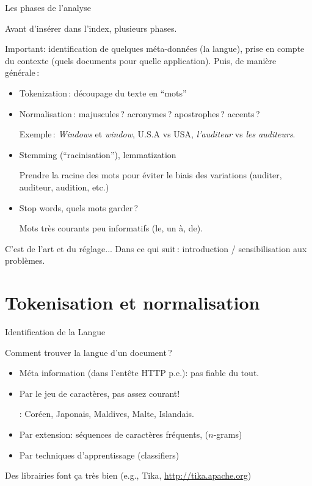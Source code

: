 \begin{frame}{Les phases de l'analyse}

Avant d'insérer dans l'index, plusieurs phases.

\vfill

Important: identification de quelques méta-données (la langue), prise en compte du contexte
(quels documents pour quelle application). Puis, de manière  générale\,:

\begin{itemize}
\item \alert{Tokenization}\,: découpage du texte en ``mots''
\item \alert{Normalisation}\,: majuscules\,? acronymes\,? apostrophes\,? accents\,?

     Exemple\,: \textit{Windows} et \textit{window}, U.S.A vs USA, \emph{l'auditeur}  vs \emph{les auditeurs}.
     
     \item \alert{Stemming} (``racinisation''), \alert{lemmatization}
     
     Prendre la racine des mots pour éviter le biais des variations (auditer, auditeur, audition, etc.)
     
     \item  \alert{Stop words}, quels mots garder\,?
     
     Mots très courants peu informatifs (le, un à, de).
\end{itemize}

C'est de l'art et du réglage... Dans ce qui suit\,: introduction / sensibilisation aux problèmes.

\end{frame}


\section{Tokenisation et normalisation}

\begin{frame}{Identification de la Langue}

Comment trouver la langue d'un document\,?

\begin{itemize}

\item Méta information (dans l'entête HTTP p.e.): pas fiable du tout.

\item \alert{Par le jeu de caractères}, pas assez courant!


\pause

: Coréen, Japonais, Maldives, Malte, Islandais.

\item Par extension: \alert{séquences de caractères fréquents}, ($n$-grams)

\item Par techniques d'apprentissage (\alert{classifiers})

\end{itemize}

Des librairies font ça très bien (e.g., Tika, \url{http://tika.apache.org})
\end{frame}


